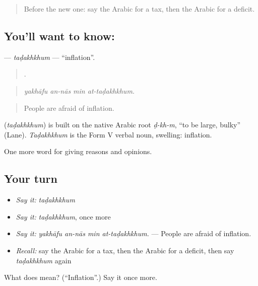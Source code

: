 \begin{quote}
Before the new one: say the Arabic for a tax, then the Arabic for a deficit.
\end{quote}

\subsection*{You'll want to know: }
\textbf{} — \emph{taḍakhkhum} — \textquotedblleft{}inflation\textquotedblright{}.

\begin{quote}
   .
\end{quote}

\begin{quote}
\emph{yakhāfu an-nās min at-taḍakhkhum.}
\end{quote}

\begin{quote}
People are afraid of inflation.
\end{quote}

\begin{cousinweb}
\textbf{} (\emph{taḍakhkhum}) is built on the native Arabic root \emph{ḍ-kh-m}, \textquotedblleft{}to be large, bulky\textquotedblright{} (Lane). \emph{Taḍakhkhum} is the Form V verbal noun, swelling: inflation.
\end{cousinweb}

\begin{grammarlens}[title={What you've built}]
One more word for giving reasons and opinions.
\end{grammarlens}

\subsection*{Your turn}
\begin{itemize}
\raggedright
  \item \emph{Say it:} \emph{taḍakhkhum}
  \item \emph{Say it:} \emph{taḍakhkhum}, once more
  \item \emph{Say it:} \emph{yakhāfu an-nās min at-taḍakhkhum.} — People are afraid of inflation.
  \item \emph{Recall:} say the Arabic for a tax, then the Arabic for a deficit, then say \emph{taḍakhkhum} again
\end{itemize}

\begin{tcolorbox}[breakable,colback=teal!4,colframe=teal!35!black,title={Before you move on}]
What does  mean? (\textquotedblleft{}Inflation\textquotedblright{}.) Say it once more.
\end{tcolorbox}
